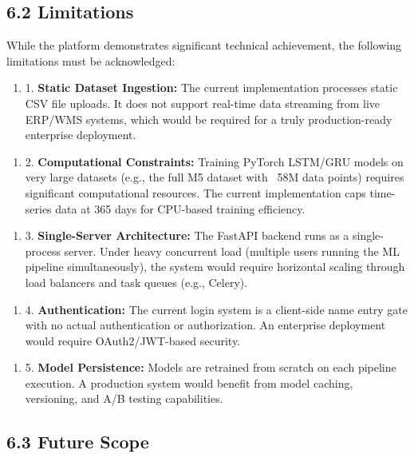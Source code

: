 \documentclass[12pt, a4paper]{report}
\begin{document}
\subsection{6.2 Limitations}

While the platform demonstrates significant technical achievement, the following limitations must be acknowledged:

\begin{enumerate}
\item 1. \textbf{Static Dataset Ingestion:} The current implementation processes static CSV file uploads. It does not support real-time data streaming from live ERP/WMS systems, which would be required for a truly production-ready enterprise deployment.
\end{enumerate}

\begin{enumerate}
\item 2. \textbf{Computational Constraints:} Training PyTorch LSTM/GRU models on very large datasets (e.g., the full M5 dataset with ~58M data points) requires significant computational resources. The current implementation caps time-series data at 365 days for CPU-based training efficiency.
\end{enumerate}

\begin{enumerate}
\item 3. \textbf{Single-Server Architecture:} The FastAPI backend runs as a single-process server. Under heavy concurrent load (multiple users running the ML pipeline simultaneously), the system would require horizontal scaling through load balancers and task queues (e.g., Celery).
\end{enumerate}

\begin{enumerate}
\item 4. \textbf{Authentication:} The current login system is a client-side name entry gate with no actual authentication or authorization. An enterprise deployment would require OAuth2/JWT-based security.
\end{enumerate}

\begin{enumerate}
\item 5. \textbf{Model Persistence:} Models are retrained from scratch on each pipeline execution. A production system would benefit from model caching, versioning, and A/B testing capabilities.
\end{enumerate}

\subsection{6.3 Future Scope}
\end{document}
